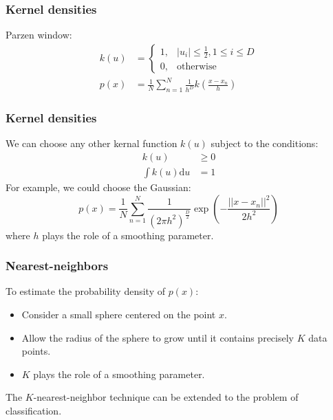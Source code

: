 \documentclass{beamer}
\begin{document}
\begin{frame}
    \frametitle{Kernel densities}
    Parzen window:
    \begin{align*}
        k(u)&=
        \begin{cases}
            1,&|u_{i}|\le\frac{1}{2},1\le{}i\le{}D \\
            0,&\textrm{otherwise}
        \end{cases} \\
        p(x)&=\frac{1}{N}\sum_{n=1}^{N}\frac{1}{h^{D}}k(\frac{x-x_{n}}{h})
    \end{align*}
\end{frame}

\begin{frame}
    \frametitle{Kernel densities}
    We can choose any other kernal function $k(u)$ subject to the conditions:
    \begin{align*}
        k(u)&\ge{}0 \\
        \int{}k(u)\mathrm{d}u&=1
    \end{align*}
    For example, we could choose the Gaussian:
    \begin{equation*}
        p(x)=\frac{1}{N}\sum_{n=1}^{N}\frac{1}{(2\pi{}h^{2})^{\frac{D}{2}}}\exp(-\frac{||x-x_{n}||^{2}}{2h^{2}})
    \end{equation*}
    where $h$ plays the role of a smoothing parameter.
\end{frame}

\begin{frame}
    \frametitle{Nearest-neighbors}
    To estimate the probability density of $p(x)$:
    \begin{itemize}
        \item Consider a small sphere centered on the point $x$.
        \item Allow the radius of the sphere to grow until it contains precisely $K$ data points.
        \item $K$ plays the role of a smoothing parameter.
    \end{itemize}
    The $K$-nearest-neighbor technique can be extended to the problem of classification.
\end{frame}
\end{document}
